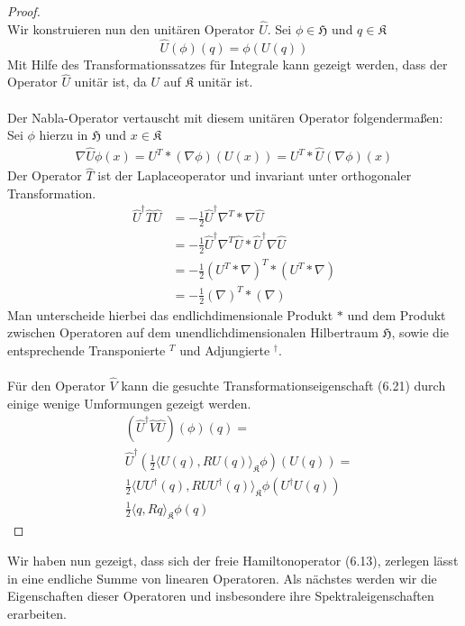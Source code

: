 \documentclass[11pt,a4paper,leqno]{report}
\numberwithin{equation}{chapter}
\begin{document}
\begin{proof}
\begin{equation*}
	\end{equation*}
	Wir konstruieren nun den unit\"aren Operator $\hat{U}$. Sei $\phi\in\mathfrak{H}$ und $q\in\mathfrak{K}$
	\begin{equation*}
		\hat{U}(\phi)(q)=\phi(U(q))
	\end{equation*}
	Mit Hilfe des Transformationssatzes f\"ur Integrale kann gezeigt werden, dass der Operator $\hat{U}$ unit\"ar ist, da $U$ auf $\mathfrak{K}$ unit\"ar ist.\\
	\\
	Der Nabla-Operator vertauscht mit diesem unit\"aren Operator folgendermaßen:\\
	Sei $\phi$ hierzu in $\mathfrak{H}$ und $x\in \mathfrak{K}$
	\begin{align}
		\nabla \hat{U}\phi(x)=U^T * (\nabla \phi) (U(x)) = U^T * \hat{U}(\nabla \phi) (x)
	\end{align}
	Der Operator $\hat{T}$ ist der Laplaceoperator und invariant unter orthogonaler Transformation.
	\begin{align*}
		\hat{U}^\dagger\hat{T}\hat{U} &= -\frac{1}{2}\hat{U}^\dagger\nabla^T * \nabla \hat{U}\\
		&=-\frac{1}{2}\hat{U}^\dagger\nabla^T\hat{U} * \hat{U}^\dagger\nabla \hat{U}\\
		&=-\frac{1}{2}(U^T*\nabla)^T*(U^T*\nabla)\\
		&=-\frac{1}{2}(\nabla)^T*(\nabla)
	\end{align*}
	Man unterscheide hierbei das endlichdimensionale Produkt $*$ und dem Produkt zwischen Operatoren auf dem unendlichdimensionalen Hilbertraum $\mathfrak{H}$, sowie die entsprechende Transponierte $^T$ und Adjungierte $^\dagger$.\\  
	\\ 
	F\"ur den Operator $\hat{V}$ kann die gesuchte Transformationseigenschaft (6.21) durch einige wenige Umformungen gezeigt werden.
	\begin{align*}
		&(\hat{U}^\dagger\hat{V}\hat{U})(\phi)(q)= \\
		&\hat{U}^\dagger(\frac{1}{2}\langle U(q), R U(q)\rangle_{\mathfrak{K}}\phi)(U(q))=\\
		&\frac{1}{2}\langle  UU^\dagger(q), R  UU^\dagger(q)\rangle_{\mathfrak{K}}\phi(U^\dagger U(q))\\
		&\frac{1}{2}\langle q, R q\rangle_{\mathfrak{K}}\phi(q)
	\end{align*}

\end{proof}
\noindent
Wir haben nun gezeigt, dass sich der freie Hamiltonoperator (6.13), zerlegen l\"asst in eine endliche Summe von linearen Operatoren. Als n\"achstes werden wir die Eigenschaften dieser Operatoren und insbesondere ihre Spektraleigenschaften erarbeiten.
\end{document}
